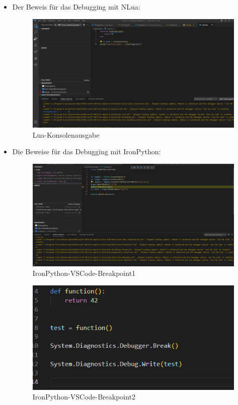 \begin{itemize}
    \item Der Beweis für das Debugging mit NLua:
    
    \begin{figure}[H]
        \centering
        \includegraphics[scale=0.5]{pics/Lua-Konsolenausgabe.png}
        \caption{Lua-Konsolenausgabe}
        \label{fig:impl:KonsolenausgabeLua}
    \end{figure}

\newpage
    \item Die Beweise für das Debugging mit IronPython:
    \begin{figure}[H]
        \centering
        \includegraphics[scale=0.5]{pics/IronPythonVSCodeBreakpoint1.png}
        \caption{IronPython-VSCode-Breakpoint1}
        \label{fig:impl:IronPythonVSCodeBreakpoint1}
    \end{figure}

    \begin{figure}[H]
        \centering
        \includegraphics{pics/IronPythonVSCodeBreakpoint2.png}
        \caption{IronPython-VSCode-Breakpoint2}
        \label{fig:impl:IronPythonVSCodeBreakpoint2}
    \end{figure}


\end{itemize}
